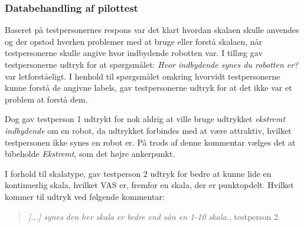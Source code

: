 \subsubsection*{Databehandling af pilottest}
%
Baseret på testpersonernes respons var det klart hvordan skalaen skulle anvendes og der opstod hverken problemer med at bruge eller forstå skalaen, når testpersonerne skulle angive hvor indbydende robotten var. I tillæg gav testpersonerne udtryk for at spørgsmålet: \textit{Hvor indbydende synes du robotten er?} var letforståeligt. I henhold til spørgsmålet omkring hvorvidt testpersonerne kunne forstå de angivne labels, gav testpersonerne udtryk for at det ikke var et problem at forstå dem. 

Dog gav testperson 1 udtrykt for nok aldrig at ville bruge udtrykket \textit{ekstremt indbydende} om en robot, da udtrykket forbindes med at være attraktiv, hvilket testpersonen ikke synes en robot er. På trods af denne kommentar vælges det at bibeholde \textit{Ekstremt}, som det højre ankerpunkt.

I forhold til skalatype, gav testperson 2 udtryk for bedre at kunne lide en kontinuerlig skala, hvilket VAS er, fremfor en skala, der er punktopdelt. Hvilket kommer til udtryk ved følgende kommentar:
% 
\begin{quotation}
  \textit{[...] synes den her skala er bedre end sån en 1-10 skala.}, testperson 2.
\end{quotation}


